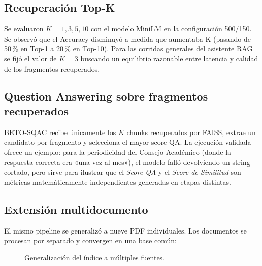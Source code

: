 \documentclass[12pt,letterpaper]{article}
\begin{document}
\subsection{Recuperación Top-K}

Se evaluaron $K=1,3,5,10$ con el modelo MiniLM en la configuración 500/150.
Se observó que el Accuracy disminuyó a medida que aumentaba K (pasando de
50\,\% en Top-1 a 20\,\% en Top-10). Para las corridas generales del asistente
RAG se fijó el valor de $K=3$ buscando un equilibrio razonable entre latencia
y calidad de los fragmentos recuperados.

\subsection{Question Answering sobre fragmentos recuperados}

BETO-SQAC recibe únicamente los $K$ chunks recuperados por FAISS, extrae un candidato
por fragmento y selecciona el mayor score QA. La ejecución validada ofrece un
ejemplo: para la periodicidad del Consejo Académico (donde la respuesta correcta
era «una vez al mes»), el modelo falló devolviendo un string cortado,
pero sirve para ilustrar que el \textit{Score QA} y el \textit{Score de Similitud}
son métricas matemáticamente independientes generadas en etapas distintas.

\subsection{Extensión multidocumento}

El mismo pipeline se generalizó a nueve PDF individuales. Los documentos se
procesan por separado y convergen en una base común:

\begin{figure}[!htbp]
\centering
{}
\caption{Generalización del índice a múltiples fuentes.}
\end{figure}
\end{document}
